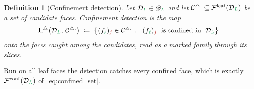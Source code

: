 \documentclass[a4paper, 12pt]{article}
\makeatletter
\DeclareRobustCommand{\candF}[1][]{\mathcal{C}^{\triangle\ifx\@empty#1\@empty\else,#1\fi}}
\newcommand{\detectF}{\Pi^{\triangle}}                           %
\newcommand{\green}{\color{ForestGreen}}
\newcommand{\brickred}{\color{BrickRed}}
\newcommand{\F}{\mathcal{F}}
\newcommand{\face}[2]{\freeQ{f}{}{#1}{#2}}
\newcommand{\fineIdxone}{{\brickred j}}
\renewcommand{\l}{{\green\ell}}
\renewcommand{\L}{{\green L}}
\newcommand{\freeQ}[4]{ ( {#1}^{#2}_{#3} )_{#4}}
\newtheorem{definition}[theorem]{Definition}
\theoremstyle{definition}
\theoremstyle{plain}
\numberwithin{equation}{section}
\DeclareRobustCommand{\domseq}[1][]{\mathcal{D}\ifx\@empty#1\@empty\else_{#1}\fi}
\newcommand{\alldomseqs}{\mathscr{D}}
\newcommand{\leafMesh}{\F^{\mathrm{leaf}}}                  %
\makeatother
\begin{document}
\begin{definition}[Confinement detection]
    \label{def:confined_detection}
    Let $\domseq[\L] \in \alldomseqs_\L$ and let $\candF \subseteq \leafMesh(\domseq[\L])$ be a set of candidate faces. \emph{Confinement detection} is the map
    \begin{equation}
        \label{eq:confined_detection}
        \detectF \big( \domseq[\L], \, \candF \big) \; \coloneq \; \big\{ \face{\l}{\fineIdxone} \in \candF \; \colon \;\; \face{\l}{\fineIdxone} \;\text{ is confined in }\; \domseq[\L] \big\}
    \end{equation}
    onto the faces caught among the candidates, read as a marked family through its slices.
\end{definition}

Run on all leaf faces the detection catches every confined face, which is exactly $\F^{\mathrm{conf}}(\domseq[\L])$ of~\eqref{eq:confined_set}.
\end{document}
